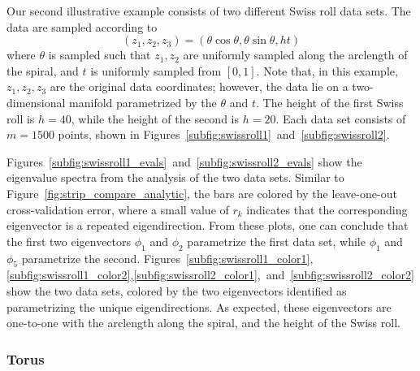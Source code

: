 \documentclass[3p]{elsarticle}
\begin{document}
Our second illustrative example consists of two different Swiss roll data sets.
%
The data are sampled according to
\begin{equation}
(z_1, z_2, z_3) = (\theta \cos \theta , \theta \sin \theta, h t)
\end{equation}
%
where $\theta$ is sampled such that $z_1, z_2$ are uniformly sampled along the arclength of the spiral, and $t$ is uniformly sampled from $[0,1]$.
%
Note that, in this example, $z_1, z_2, z_3$ are the original data coordinates; however, the data lie on a
two-dimensional manifold parametrized by the $\theta$ and $t$.
%
The height of the first Swiss roll is $h = 40$, while the height of the second is $h = 20$.
%
Each data set consists of $m=1500$ points, shown in Figures~\ref{subfig:swissroll1}~and~\ref{subfig:swissroll2}.
%

Figures~\ref{subfig:swissroll1_evals}~and~\ref{subfig:swissroll2_evals} show the eigenvalue spectra from the analysis of the two data sets.
%
Similar to Figure~\ref{fig:strip_compare_analytic}, the bars are colored by the leave-one-out cross-validation error, 
where a small value of $r_k$ indicates that the corresponding eigenvector is a repeated eigendirection.
%
From these plots, one can conclude that the first two eigenvectors $\phi_1$ and $\phi_2$ parametrize the first data set, 
while $\phi_1$ and $\phi_5$ parametrize the second.
%
Figures~\ref{subfig:swissroll1_color1},\ref{subfig:swissroll1_color2},\ref{subfig:swissroll2_color1},~and~\ref{subfig:swissroll2_color2} 
show the two data sets, colored by the two eigenvectors identified as parametrizing the unique eigendirections.
%
As expected, these eigenvectors are one-to-one with the arclength along the spiral, and the height of the Swiss roll.

\subsubsection{Torus}
\end{document}
